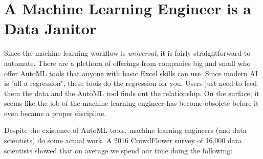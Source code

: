 \section{A Machine Learning Engineer is a Data Janitor}

Since the machine learning workflow is \textit{universal}, it is fairly straightforward to automate. There are a plethora of offerings from companies big and small who offer AutoML tools that anyone with basic Excel skills can use. Since modern AI is "all a regression", these tools do the regression for you. Users just need to feed them the data and the AutoML tool finds out the relationship. On the surface, it seems like the job of the machine learning engineer has become obsolete before it even became a proper discipline.

Despite the existence of AutoML tools, machine learning engineers (and data scientists) do some actual work. A 2016 CrowdFlower survey of 16,000 data scientists showed that on average we spend our time doing the following:

